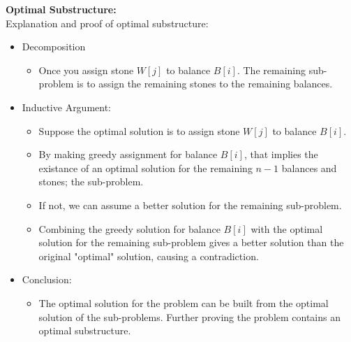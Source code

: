 \documentclass{article}[12pt]
\begin{document}
\pagebreak
\noindent\textbf{Optimal Substructure:} \\
Explanation and proof of optimal substructure: \\
\begin{itemize}
  \item Decomposition
    \begin{itemize}
      \item Once you assign stone $W[j]$ to balance $B[i]$.
        The remaining sub-problem is to assign the remaining stones to the remaining balances.
    \end{itemize}
  \item Inductive Argument:
    \begin{itemize}
      \item Suppose the optimal solution is to assign stone $W[j]$ to balance $B[i]$.
      \item By making greedy assignment for balance $B[i]$, that implies
        the existance of an optimal solution for the remaining $n-1$ balances and stones; the sub-problem.
      \item If not, we can assume a better solution for the remaining sub-problem.
      \item Combining the greedy solution for balance $B[i]$ with the optimal solution for the remaining sub-problem
        gives a better solution than the original "optimal" solution, causing a contradiction.
    \end{itemize}
  \item Conclusion:
    \begin{itemize}
      \item The optimal solution for the problem can be built from the optimal solution of the sub-problems.
        Further proving the problem contains an optimal substructure.
    \end{itemize}
\end{itemize}

\newpage
\end{document}
